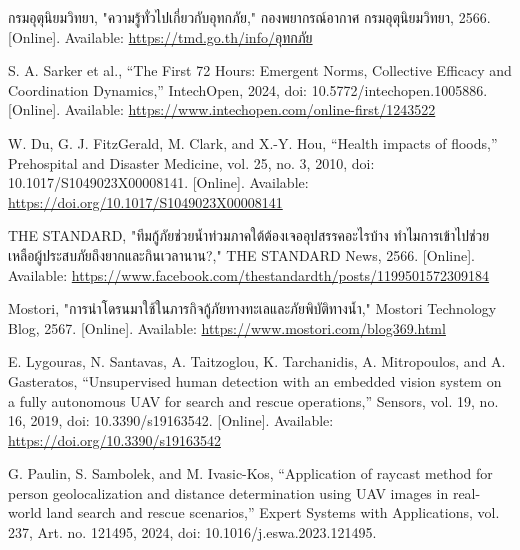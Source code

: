 \documentclass[12pt]{article}
\newcommand{\headerfont}{\fontsize{18pt}{21.6pt}\selectfont}
\newcommand{\infofont}{\fontsize{16pt}{19.2pt}\selectfont}
\newcommand{\Head}[1]{\vspace{1.2em}\noindent{\headerfont\bfseries #1}\vspace{0.4em}\par}
\begin{document}
\clearpage
\Head{References}
\infofont
\begin{enumerate}[label={[\arabic*]},leftmargin=2em,itemsep=0.4em]
\item \foreignlanguage{thai}{กรมอุตุนิยมวิทยา}, \foreignlanguage{thai}{"ความรู้ทั่วไปเกี่ยวกับอุทกภัย,"} \foreignlanguage{thai}{กองพยากรณ์อากาศ กรมอุตุนิยมวิทยา}, 2566. [Online]. Available: \url{https://tmd.go.th/info/อุทกภัย}

\item S. A. Sarker et al., ``The First 72 Hours: Emergent Norms, Collective Efficacy and Coordination Dynamics,'' IntechOpen, 2024, doi: 10.5772/intechopen.1005886. [Online]. Available: \url{https://www.intechopen.com/online-first/1243522}

\item W. Du, G. J. FitzGerald, M. Clark, and X.-Y. Hou, ``Health impacts of floods,'' Prehospital and Disaster Medicine, vol. 25, no. 3, 2010, doi: 10.1017/S1049023X00008141. [Online]. Available: \url{https://doi.org/10.1017/S1049023X00008141}

\item \foreignlanguage{thai}{THE STANDARD}, \foreignlanguage{thai}{"ทีมกู้ภัยช่วยน้ำท่วมภาคใต้ต้องเจออุปสรรคอะไรบ้าง ทำไมการเข้าไปช่วยเหลือผู้ประสบภัยถึงยากและกินเวลานาน?,"} THE STANDARD News, 2566. [Online]. Available: \url{https://www.facebook.com/thestandardth/posts/1199501572309184}

\item \foreignlanguage{thai}{Mostori}, \foreignlanguage{thai}{"การนำโดรนมาใช้ในภารกิจกู้ภัยทางทะเลและภัยพิบัติทางน้ำ,"} Mostori Technology Blog, 2567. [Online]. Available: \url{https://www.mostori.com/blog369.html}

\item E. Lygouras, N. Santavas, A. Taitzoglou, K. Tarchanidis, A. Mitropoulos, and A. Gasteratos, ``Unsupervised human detection with an embedded vision system on a fully autonomous UAV for search and rescue operations,'' Sensors, vol. 19, no. 16, 2019, doi: 10.3390/s19163542. [Online]. Available: \url{https://doi.org/10.3390/s19163542}

\item G. Paulin, S. Sambolek, and M. Ivasic-Kos, ``Application of raycast method for person geolocalization and distance determination using UAV images in real-world land search and rescue scenarios,'' Expert Systems with Applications, vol. 237, Art. no. 121495, 2024, doi: 10.1016/j.eswa.2023.121495.


\end{enumerate}
\end{document}
